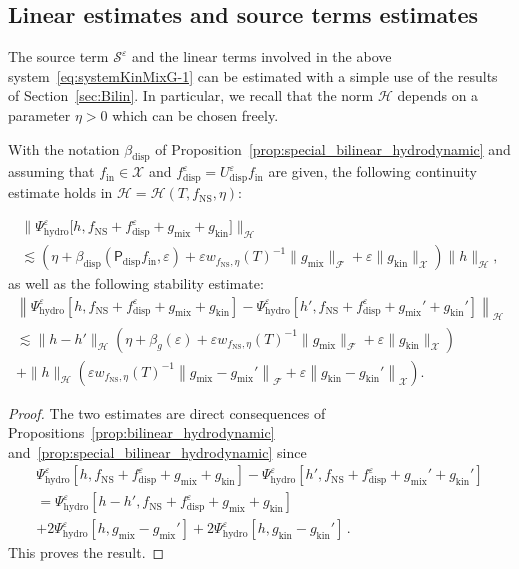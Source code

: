 \documentclass[AHL,Unicode,longabstracts,published]{cedram}
\newcommand{\ini}{\mathrm{in}}
\newcommand{\ns}{\mathrm{NS}}
\newcommand{\hyd}{\mathrm{hydro}}
\newcommand{\mix}{\mathrm{mix}}
\newcommand{\kin}{\mathrm{kin}}
\newcommand{\disp}{\mathrm{disp}}
\newcommand{\XX}{\mathcal{X}}
\newcommand{\PP}{\mathsf{P}}
\renewcommand{\SS}{\mathcal{S}}
\newcommand{\FFF}{\mathscr{F}}
\newcommand{\HHH}{\mathscr{H}}
\newcommand{\GGG}{\mathscr{X}}
\newcommand{\SSSs}{\HHH}
\newcommand{\SSl}{\XX}
\newcommand{\SSSl}{\GGG}
\newcommand{\SSSm}{\FFF}
\newcommand*\eps{{\varepsilon}}
\begin{document}
\subsection{Linear estimates and source terms estimates} 

The source term $\SS^\eps$ and the linear terms involved in the above system~\eqref{eq:systemKinMixG-1} can be estimated with a simple use of the results of Section~\ref{sec:Bilin}. In particular, we recall that the norm $\SSSs$ depends on a parameter $\eta >0$ which can be chosen freely.


\begin{prop}\label{prop:linear_hydrodynamic}
With the notation ${\beta_{\disp}}$ of Proposition~\ref{prop:special_bilinear_hydrodynamic} and assuming that $f_\ini \in \SSl$ and $f^\eps_\disp = U^\eps_\disp f_\ini$ are given, the following continuity estimate holds in $\SSSs=\SSSs(T, f_\ns, \eta)$:

\break
\begin{multline*}
\big\| \Psi^\eps_\hyd\big[h,  f_\ns + f^\eps_\disp + g_\mix + g_\kin\big] \big\|_{ \SSSs } \\
 \lesssim \left(\eta + {\beta_{\disp}}\left(\PP_\disp f_\ini, \eps\right) + \eps w_{f_\ns, \eta}(T)^{-1} \| g_\mix \|_{\SSSm} + \eps \| g_\kin \|_\SSSl\right) \| h \|_\SSSs,
\end{multline*}
as well as the following stability estimate:
\begin{multline*}
\left\| \Psi^\eps_\hyd\left[h, f_\ns  + f^\eps_\disp + g _\mix + g _\kin\right] - \Psi^\eps_\hyd\left[h', f_\ns + f^\eps_\disp + g_\mix '+ g_\kin'\right] \right\|_\SSSs \\
\lesssim \| h - h' \|_\SSSs \left(\eta + \beta_{g}(\eps) + \eps w_{f_\ns, \eta}(T)^{-1} \| g_\mix \|_{\SSSm} + \eps \| g_\kin \|_\SSSl \right) \\
 + \| h \|_\SSSs \left(\eps w_{f_\ns, \eta}(T)^{-1} \left\| g_\mix - g_\mix' \right\|_\SSSm + \eps \left\| g_\kin - g_\kin' \right\|_\SSSl \right).
\end{multline*}
\end{prop}

\begin{proof}
The two estimates are direct consequences of Propositions~\ref{prop:bilinear_hydrodynamic} and~\ref{prop:special_bilinear_hydrodynamic} since
\begin{multline*}
\Psi^\eps_\hyd\left[h, f_\ns + f^\eps_\disp + g _\mix + g _\kin\right] - \Psi^\eps_\hyd\left[h', f_\ns + f^\eps_\disp + g_\mix '+ g_\kin'\right]\\
=  \Psi^\eps_\hyd\left[h- h', f_\ns + f^\eps_\disp + g_\mix + g_\kin\right] \\
 + 2 \Psi^\eps_\hyd\left[h, g_\mix-g_\mix'\right] + 2 \Psi^\eps_\hyd\left[h, g_\kin-g_\kin'\right]\,.
\end{multline*}
This proves the result.
\end{proof}
\end{document}
